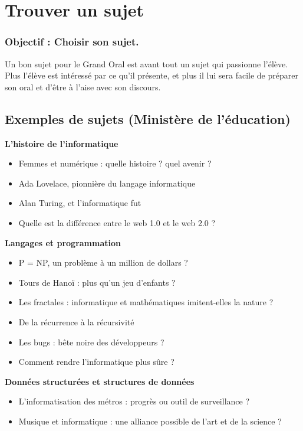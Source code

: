 \setcounter{section}{0}

\chapter*{Trouver un sujet}
\subsection*{\centering Objectif : Choisir son sujet.}

Un bon sujet pour le Grand Oral est avant tout un sujet qui passionne l’élève. Plus l’élève est intéressé par ce qu’il présente, et plus il lui sera facile de préparer son oral et d’être à l’aise avec son discours.\\

\section{Exemples de sujets (Ministère de l'éducation)}
\textbf{L’histoire de l’informatique}
\begin{itemize}
    \item Femmes et numérique : quelle histoire ? quel avenir ?
    \item Ada Lovelace, pionnière du langage informatique
    \item Alan Turing, et l’informatique fut
    \item Quelle est la différence entre le web 1.0 et le web 2.0 ?
\end{itemize}

\textbf{Langages et programmation}
\begin{itemize}
\item P = NP, un problème à un million de dollars ?
\item Tours de Hanoï : plus qu’un jeu d’enfants ?
\item Les fractales : informatique et mathématiques imitent-elles la nature ?
\item De la récurrence à la récursivité
\item Les bugs : bête noire des développeurs ?
\item Comment rendre l’informatique plus sûre ?
\end{itemize}

\textbf{Données structurées et structures de données}
\begin{itemize}
\item L’informatisation des métros : progrès ou outil de surveillance ?
\item Musique et informatique : une alliance possible de l’art et de la science ?
\end{itemize}

